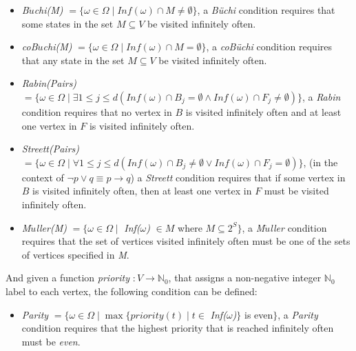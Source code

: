 \documentclass{article}
\begin{document}
\begin{itemize}
    \item \textit{B$\ddot{u}$chi(M)} $= \{\omega \in \Omega \mid \textit{Inf}(\omega) \cap M \neq \emptyset\}$,  a \textit{B\"uchi} condition requires that some states in the set $M \subseteq V$ be visited infinitely often.

    \item \textit{coB$\ddot{u}$chi(M)} $ = \{\omega \in \Omega \mid \textit{Inf}(\omega) \cap M = \emptyset\}$, a \textit{coB\"uchi} condition requires that any state in the set $M \subseteq V$ be visited infinitely often.

    \item \textit{Rabin(Pairs)} $ = \{\omega \in \Omega \mid  \exists 1 \leqslant j \leqslant d (\textit{Inf}(\omega) \cap B_j = \emptyset \wedge \textit{Inf}(\omega) \cap F_j \neq \emptyset)\}$, a \textit{Rabin} condition requires that no vertex in $B$ is visited infinitely often and at least one vertex in $F$ is visited infinitely often.

    \item \textit{Streett(Pairs)} $ = \{\omega \in \Omega \mid  \forall 1 \leqslant j \leqslant d (\textit{Inf}(\omega) \cap B_j \neq \emptyset \vee \textit{Inf}(\omega) \cap F_j = \emptyset)\}$, (in the context of $\neg p \vee q \equiv p \rightarrow q$) a \textit{Streett} condition requires that if some vertex in $B$ is visited infinitely often, then at least one vertex in $F$ must be visited infinitely often.

    \item \textit{M$\ddot{u}$ller(M)} $ =  \{\omega \in \Omega \mid $ \textit{Inf($\omega$)} $\in M$ where $M \subseteq 2^S \}$, a \textit{M$\ddot{u}$ller} condition requires that the set of vertices visited infinitely often must be one of the sets of vertices specified in \textit{M}.
\end{itemize}

And given a function \textit{priority} $ : V \rightarrow \mathbb{N}_0 $, that assigns a non-negative integer $\mathbb{N}_0$ label to each vertex, the following condition can be defined:

\begin{itemize}
    \item \textit{Parity} $ =\{ \omega \in \Omega \mid \max\{\textit{priority}(t) \mid t \in $ \textit{Inf($\omega$)}$\}$ is even$\}$, a \textit{Parity} condition requires that the highest priority that is reached infinitely often must be \textit{even}.
\end{itemize}
\end{document}
